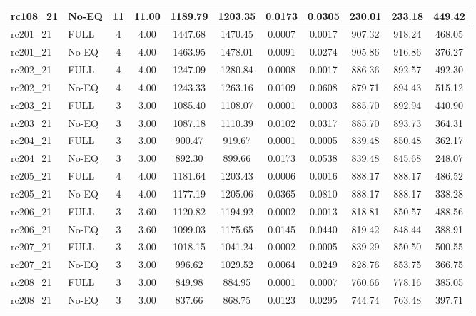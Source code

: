 \begin{longtable}{@{\extracolsep{\fill}}llccccccccc@{}}
rc108\_21 & No-EQ & 11 & 11.00 & 1189.79 & 1203.35 & 0.0173 & 0.0305 & 230.01 & 233.18 & 449.42 \\
\midrule
rc201\_21 & FULL & 4 & 4.00 & 1447.68 & 1470.45 & 0.0007 & 0.0017 & 907.32 & 918.24 & 468.05 \\
rc201\_21 & No-EQ & 4 & 4.00 & 1463.95 & 1478.01 & 0.0091 & 0.0274 & 905.86 & 916.86 & 376.27 \\
\midrule
rc202\_21 & FULL & 4 & 4.00 & 1247.09 & 1280.84 & 0.0008 & 0.0017 & 886.36 & 892.57 & 492.30 \\
rc202\_21 & No-EQ & 4 & 4.00 & 1243.33 & 1263.16 & 0.0109 & 0.0608 & 879.71 & 894.43 & 515.12 \\
\midrule
rc203\_21 & FULL & 3 & 3.00 & 1085.40 & 1108.07 & 0.0001 & 0.0003 & 885.70 & 892.94 & 440.90 \\
rc203\_21 & No-EQ & 3 & 3.00 & 1087.18 & 1110.39 & 0.0102 & 0.0317 & 885.70 & 893.73 & 364.31 \\
\midrule
rc204\_21 & FULL & 3 & 3.00 & 900.47 & 919.67 & 0.0001 & 0.0005 & 839.48 & 850.48 & 362.17 \\
rc204\_21 & No-EQ & 3 & 3.00 & 892.30 & 899.66 & 0.0173 & 0.0538 & 839.48 & 845.68 & 248.07 \\
\midrule
rc205\_21 & FULL & 4 & 4.00 & 1181.64 & 1203.43 & 0.0006 & 0.0016 & 888.17 & 888.17 & 486.52 \\
rc205\_21 & No-EQ & 4 & 4.00 & 1177.19 & 1205.06 & 0.0365 & 0.0810 & 888.17 & 888.17 & 338.28 \\
\midrule
rc206\_21 & FULL & 3 & 3.60 & 1120.82 & 1194.92 & 0.0002 & 0.0013 & 818.81 & 850.57 & 488.56 \\
rc206\_21 & No-EQ & 3 & 3.60 & 1099.03 & 1175.65 & 0.0145 & 0.0440 & 819.42 & 848.44 & 388.91 \\
\midrule
rc207\_21 & FULL & 3 & 3.00 & 1018.15 & 1041.24 & 0.0002 & 0.0005 & 839.29 & 850.50 & 500.55 \\
rc207\_21 & No-EQ & 3 & 3.00 & 996.62 & 1029.52 & 0.0064 & 0.0249 & 828.76 & 853.75 & 366.75 \\
\midrule
rc208\_21 & FULL & 3 & 3.00 & 849.98 & 884.95 & 0.0001 & 0.0007 & 760.66 & 778.16 & 385.05 \\
rc208\_21 & No-EQ & 3 & 3.00 & 837.66 & 868.75 & 0.0123 & 0.0295 & 744.74 & 763.48 & 397.71 \\
\midrule
\end{longtable}
